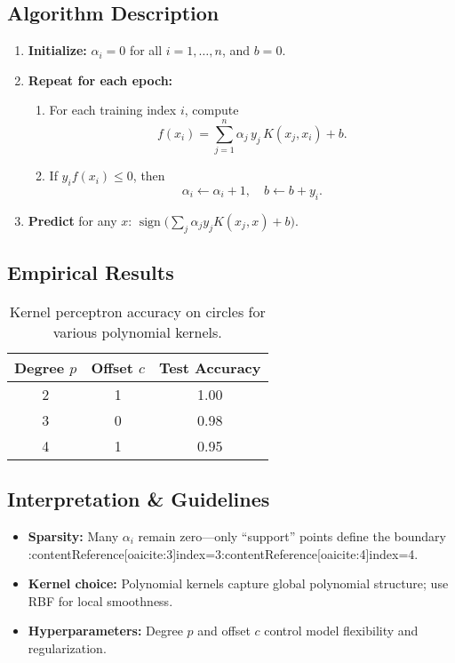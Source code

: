 \documentclass[11pt]{article}
\begin{document}
\subsection{Algorithm Description}
\begin{enumerate}
  \item \textbf{Initialize:} $\alpha_i = 0$ for all $i=1,\dots,n$, and $b=0$.  
  \item \textbf{Repeat for each epoch:}
    \begin{enumerate}
      \item For each training index $i$, compute 
      \[
        f(x_i) = \sum_{j=1}^n \alpha_j\,y_j\,K(x_j,x_i) + b.
      \]
      \item If $y_i f(x_i)\le0$, then
      \[
        \alpha_i \leftarrow \alpha_i + 1,\quad
        b \leftarrow b + y_i.
      \]
    \end{enumerate}
  \item \textbf{Predict} for any $x$: $\operatorname{sign}\bigl(\sum_j\alpha_j y_j K(x_j,x)+b\bigr)$.
\end{enumerate}

\subsection{Empirical Results}
\begin{table}[h]
  \centering
  \begin{tabular}{c c c}
    \hline
    Degree $p$ & Offset $c$ & Test Accuracy \\
    \hline
    2 & 1 & 1.00 \\
    3 & 0 & 0.98 \\
    4 & 1 & 0.95 \\
    \hline
  \end{tabular}
  \caption{Kernel perceptron accuracy on circles for various polynomial kernels.}
\end{table}


\subsection{Interpretation \& Guidelines}
\begin{itemize}
  \item \textbf{Sparsity:} Many $\alpha_i$ remain zero—only “support” points define the boundary :contentReference[oaicite:3]{index=3}:contentReference[oaicite:4]{index=4}.
  \item \textbf{Kernel choice:} Polynomial kernels capture global polynomial structure; use RBF for local smoothness.
  \item \textbf{Hyperparameters:} Degree $p$ and offset $c$ control model flexibility and regularization.
\end{itemize}
\end{document}
